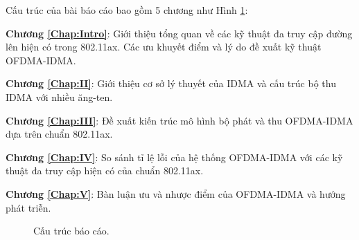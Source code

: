 Cấu trúc của bài báo cáo bao gồm 5 chương như Hình \ref{fig:Struc}:

\textbf{Chương \ref{Chap:Intro}}: Giới thiệu tổng quan về các kỹ thuật đa truy cập đường lên hiện có trong 802.11ax. Các ưu khuyết điểm và lý do đề xuất kỹ thuật OFDMA-IDMA.

\textbf{Chương \ref{Chap:II}}: Giới thiệu cơ sở lý thuyết của IDMA và cấu trúc bộ thu IDMA với nhiều ăng-ten.

\textbf{Chương \ref{Chap:III}}: Đề xuất kiến trúc mô hình bộ phát và thu OFDMA-IDMA dựa trên chuẩn 802.11ax.

\textbf{Chương \ref{Chap:IV}}: So sánh tỉ lệ lỗi của hệ thống OFDMA-IDMA với các kỹ thuật đa truy cập hiện có của chuẩn 802.11ax.

\textbf{Chương \ref{Chap:V}}: Bàn luận ưu và nhược điểm của OFDMA-IDMA và hướng phát triễn.

\begin{figure}[H]
	\centering
	
	\caption{Cấu trúc báo cáo.}
	\label{fig:Struc}
\end{figure}
